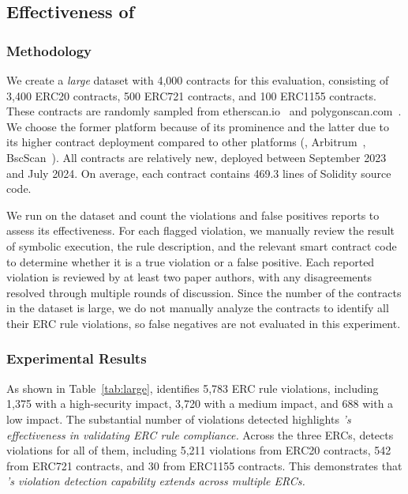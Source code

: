 \subsection{Effectiveness of \Tool{}}
\label{sec:large}





\subsubsection{Methodology}
We create a \emph{large} dataset with 4,000 contracts for this evaluation, 
consisting of 
3,400 ERC20 contracts, 500 ERC721 contracts, and 100 ERC1155 contracts.
These contracts are randomly sampled from 
etherscan.io~\cite{etherscan} and polygonscan.com~\cite{polygonscan}.
We choose the former platform because of its prominence and the latter 
due to its higher contract deployment compared to other platforms (\eg, Arbitrum~\cite{arbitrum}, BscScan~\cite{bsc}). 
All contracts are relatively new, deployed between September 2023 
and July 2024. On average, each contract contains 469.3 lines of Solidity source code.



We run \Tool{} on the dataset and count the violations and 
false positives \Tool{} reports to assess its effectiveness. 
For each flagged violation, we manually review the result of symbolic execution, 
the rule description, and the relevant smart contract code to determine 
whether it is a true violation or a false positive. 
Each reported violation is reviewed by at least two paper authors, 
with any disagreements resolved through multiple rounds of discussion. 
Since the number of the contracts in the dataset is large, 
we do not manually analyze the contracts to identify all their ERC rule violations, 
so false negatives are not evaluated in this experiment. 





\subsubsection{Experimental Results}
As shown in Table~\ref{tab:large}, 
\Tool{} identifies 5,783 ERC rule violations, 
including 1,375 with a high-security impact, 3,720 
with a medium impact, and 688 with a low impact. 
The substantial number 
of violations detected highlights \textit{\Tool{}’s effectiveness in validating ERC rule compliance.} 
Across the three ERCs, \Tool{} detects violations for all of them, 
including 5,211 violations from ERC20 contracts, 542 from ERC721 contracts, and 30 from 
ERC1155 contracts. This demonstrates that 
\textit{\Tool{}’s violation detection capability extends 
across multiple ERCs.}



